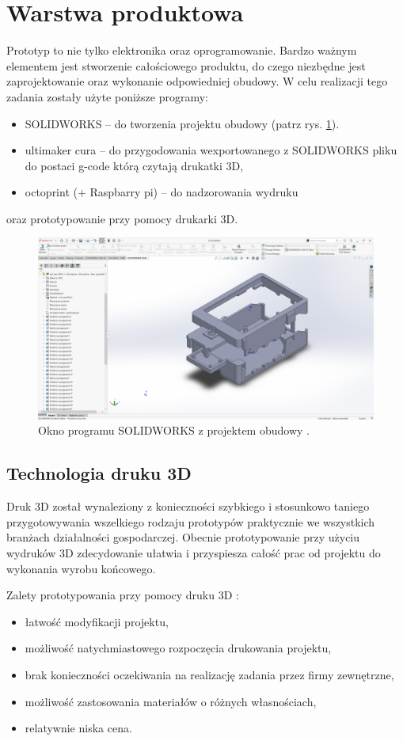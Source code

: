 \documentclass[a4paper,12pt,reqno]{article}
\begin{document}
\newpage
\section{Warstwa produktowa} \label{section:warstwa_produkcyjna} %
Prototyp to nie tylko elektronika oraz oprogramowanie. Bardzo ważnym elementem jest stworzenie całościowego produktu, do czego niezbędne jest zaprojektowanie oraz wykonanie odpowiedniej obudowy. W celu realizacji tego zadania zostały użyte poniższe programy:
\begin{itemize}
\item SOLIDWORKS – do tworzenia projektu obudowy (patrz rys. \ref{okno_solidworks}).
\item ultimaker cura – do przygodowania wexportowanego z SOLIDWORKS pliku do postaci g-code którą czytają drukatki 3D,
\item octoprint (+ Raspbarry pi) – do nadzorowania wydruku
\end{itemize}
oraz prototypowanie przy pomocy drukarki 3D.
\begin{figure}[H]%
\centering
\includegraphics[width=0.8\columnwidth]{imgs/solidworks.jpg}
\caption{Okno programu SOLIDWORKS z projektem obudowy \cite{img_me}. \label{okno_solidworks}}
\quad
\end{figure}
\subsection{Technologia druku 3D}
Druk 3D został wynaleziony z konieczności szybkiego i stosunkowo taniego przygotowywania wszelkiego rodzaju prototypów praktycznie we wszystkich branżach działalności gospodarczej. 
Obecnie prototypowanie przy użyciu wydruków 3D zdecydowanie ułatwia i przyspiesza całość prac od projektu do wykonania wyrobu końcowego.

Zalety prototypowania przy pomocy druku 3D \cite{prototyp3dzalety}:
\begin{itemize}
\item łatwość modyfikacji projektu,
\item możliwość natychmiastowego rozpoczęcia drukowania projektu,
\item brak konieczności oczekiwania na realizację zadania przez firmy zewnętrzne,
\item możliwość zastosowania materiałów o różnych własnościach,
\item relatywnie niska cena.
\end{itemize}
\end{document}
